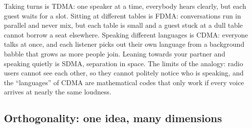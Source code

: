 
\begin{analogy}
Taking turns is TDMA: one speaker at a time, everybody hears clearly, but each guest waits for
a slot. Sitting at different tables is FDMA: conversations run in parallel and never mix, but
each table is small and a guest stuck at a dull table cannot borrow a seat elsewhere. Speaking
different languages is CDMA: everyone talks at once, and each listener picks out their own language
from a background babble that grows as more people join. Leaning towards your partner and speaking
quietly is SDMA, separation in space. The limits of the analogy: radio users cannot see each other,
so they cannot politely notice who is speaking, and the ``languages'' of CDMA are mathematical codes
that only work if every voice arrives at nearly the same loudness.
\end{analogy}


\subsection{Orthogonality: one idea, many dimensions}

